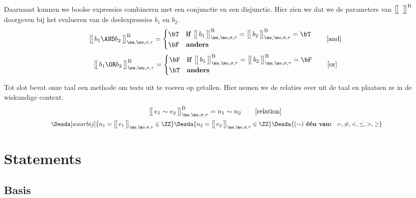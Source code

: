 Daarnaast kunnen we boolse expressies combineren met een conjunctie en een disjunctie. Hier zien we dat we de parameters van $\Express[B]{\;}{}$ doorgeven bij het evalueren van de deelexpressies $b_1$ en $b_2$.
%
\begin{equation}
  \Express[B]{b_1 \AND b_2}{\ms,\mo,\sigma,\tau}
  = \begin{cases}
    \bT & \textbf{if } \Express[B]{b_1}{\ms,\mo,\sigma,\tau} = \Express[B]{b_2}{\ms,\mo,\sigma,\tau} = \bT \\
    \bF & \textbf{anders}
  \end{cases}
  \tag*{[and]}
\end{equation}
%
\begin{equation}
  \Express[B]{b_1 \OR b_2}{\ms,\mo,\sigma,\tau}
  = \begin{cases}
    \bF & \textbf{if } \Express[B]{b_1}{\ms,\mo,\sigma,\tau} = \Express[B]{b_2}{\ms,\mo,\sigma,\tau} = \bF \\
    \bT & \textbf{anders}
  \end{cases}
  \tag*{[or]}
\end{equation}

Tot slot bevat onze taal een methode om tests uit te voeren op getallen. Hier nemen we de relaties over uit de taal en plaatsen ze in de wiskundige context.
%
\begin{gather*}
  \Express[B]{e_1 \sim e_2}{\ms,\mo,\sigma,\tau} =
  n_1 \sim n_2
  \tag*{[relation]} \\
  \Desdas{
    \Desda[waarbij]{n_1 = \Express{e_1}{\ms,\mo,\sigma,\tau} \in \ZZ}
    \Desda{n_2 = \Express{e_2}{\ms,\mo,\sigma,\tau} \in \ZZ}
    \Desda{(\sim) \textbf{ één van: } =, \neq, <, \le, >, \ge}
  }
\end{gather*}

\section{Statements}

\subsection{Basis}

